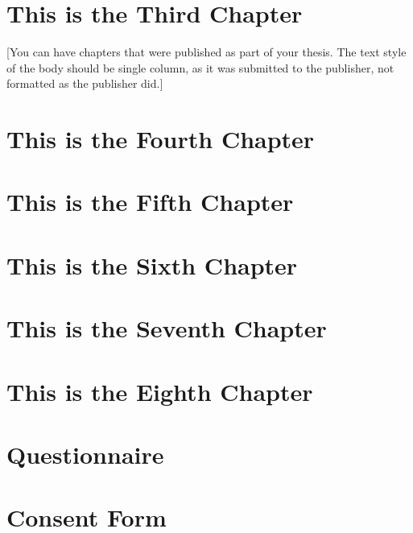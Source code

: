 \documentclass[12pt]{caltech_thesis}
\begin{document}
\chapter{This is the Third Chapter}


[You can have chapters that were published as part of your thesis. The text style of the body should be single column, as it was submitted to the publisher, not formatted as the publisher did.]

\chapter{This is the Fourth Chapter}
\chapter{This is the Fifth Chapter}
\chapter{This is the Sixth Chapter}
\chapter{This is the Seventh Chapter}
\chapter{This is the Eighth Chapter}

\printbibliography[heading=bibintoc]

\appendix

\chapter{Questionnaire}
\chapter{Consent Form}

\printindex

\theendnotes

\pocketmaterial
{} 
\end{document}
